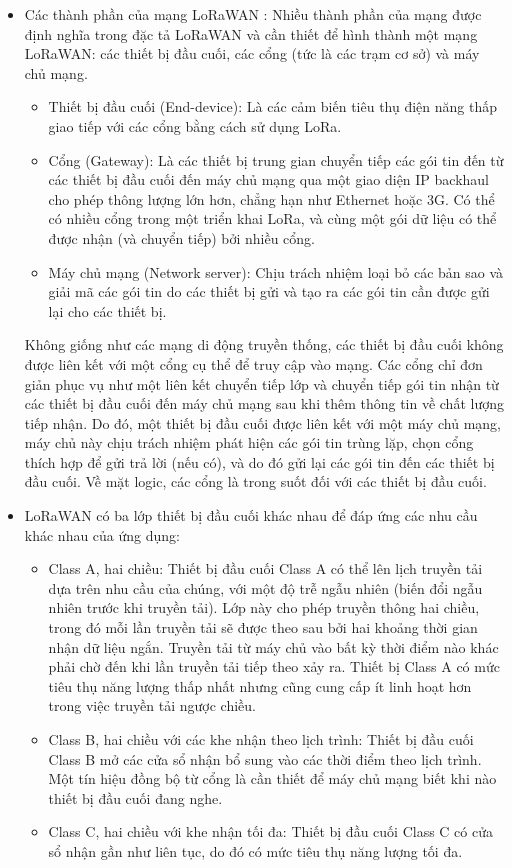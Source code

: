 \documentclass{article} %
\begin{document}
	\begin{itemize}
		\item Các thành phần của mạng LoRaWAN : 
		Nhiều thành phần của mạng được định nghĩa trong đặc tả LoRaWAN và cần thiết để hình thành một mạng LoRaWAN: các thiết bị đầu cuối, các cổng (tức là các trạm cơ sở) và máy chủ mạng.
		
		\begin{itemize}[label=$\ast$]
			\item Thiết bị đầu cuối (End-device): Là các cảm biến tiêu thụ điện năng thấp giao tiếp với các cổng bằng cách sử dụng LoRa.
			\item Cổng (Gateway): Là các thiết bị trung gian chuyển tiếp các gói tin đến từ các thiết bị đầu cuối đến máy chủ mạng qua một giao diện IP backhaul cho phép thông lượng lớn hơn, chẳng hạn như Ethernet hoặc 3G. Có thể có nhiều cổng trong một triển khai LoRa, và cùng một gói dữ liệu có thể được nhận (và chuyển tiếp) bởi nhiều cổng.
			\item Máy chủ mạng (Network server): Chịu trách nhiệm loại bỏ các bản sao và giải mã các gói tin do các thiết bị gửi và tạo ra các gói tin cần được gửi lại cho các thiết bị.
		\end{itemize}
		
		Không giống như các mạng di động truyền thống, các thiết bị đầu cuối không được liên kết với một cổng cụ thể để truy cập vào mạng. Các cổng chỉ đơn giản phục vụ như một liên kết chuyển tiếp lớp và chuyển tiếp gói tin nhận từ các thiết bị đầu cuối đến máy chủ mạng sau khi thêm thông tin về chất lượng tiếp nhận. Do đó, một thiết bị đầu cuối được liên kết với một máy chủ mạng, máy chủ này chịu trách nhiệm phát hiện các gói tin trùng lặp, chọn cổng thích hợp để gửi trả lời (nếu có), và do đó gửi lại các gói tin đến các thiết bị đầu cuối. Về mặt logic, các cổng là trong suốt đối với các thiết bị đầu cuối.
		
		\item LoRaWAN có ba lớp thiết bị đầu cuối khác nhau để đáp ứng các nhu cầu khác nhau của ứng dụng:
		
		\begin{itemize}[label=$\ast$]
			\item Class A, hai chiều: Thiết bị đầu cuối Class A có thể lên lịch truyền tải dựa trên nhu cầu của chúng, với một độ trễ ngẫu nhiên (biến đổi ngẫu nhiên trước khi truyền tải). Lớp này cho phép truyền thông hai chiều, trong đó mỗi lần truyền tải sẽ được theo sau bởi hai khoảng thời gian nhận dữ liệu ngắn. Truyền tải từ máy chủ vào bất kỳ thời điểm nào khác phải chờ đến khi lần truyền tải tiếp theo xảy ra. Thiết bị Class A có mức tiêu thụ năng lượng thấp nhất nhưng cũng cung cấp ít linh hoạt hơn trong việc truyền tải ngược chiều.
			\item Class B, hai chiều với các khe nhận theo lịch trình: Thiết bị đầu cuối Class B mở các cửa sổ nhận bổ sung vào các thời điểm theo lịch trình. Một tín hiệu đồng bộ từ cổng là cần thiết để máy chủ mạng biết khi nào thiết bị đầu cuối đang nghe.
			\item Class C, hai chiều với khe nhận tối đa: Thiết bị đầu cuối Class C có cửa sổ nhận gần như liên tục, do đó có mức tiêu thụ năng lượng tối đa.
		\end{itemize}
		

\end{itemize}
\end{document}
